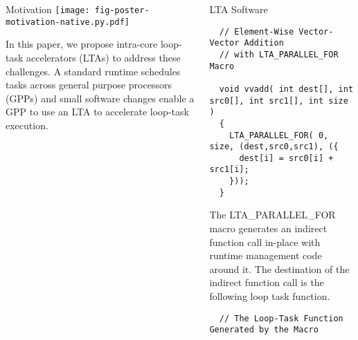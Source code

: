 \documentclass{cbxposter}
\renewcommand{\smallskip}{\vspace{0.16667in}}
\begin{document}
\begin{frame}[fragile,t]{}
\begin{columns}[T]
\begin{column}{10.5in}
\begin{block}{Motivation}
  \vspace{0.3in}
  \texttt{[image: fig-poster-motivation-native.py.pdf]}
  \vspace{0.3in}

  In this paper, we propose intra-core loop-task accelerators (LTAs) to
  address these challenges. A standard runtime schedules tasks across
  general purpose processors (GPPs) and small software changes enable a
  GPP to use an LTA to accelerate loop-task execution.

  \smallskip
\end{block}
\end{column}


\begin{column}{10.5in}


\begin{block}{LTA Software}

  \vspace{-0.1in}
  \vspace{-0.2in}

  \begin{lstlisting}
  // Element-Wise Vector-Vector Addition
  // with LTA_PARALLEL_FOR Macro

  void vvadd( int dest[], int src0[], int src1[], int size )
  {
    LTA_PARALLEL_FOR( 0, size, (dest,src0,src1), ({
      dest[i] = src0[i] + src1[i];
    }));
  }

  \end{lstlisting}
  \vspace{0.2in}

  The LTA\_PARALLEL\_FOR macro generates an indirect function call
  in-place with runtime management code around it. The destination of the
  indirect function call is the following loop task function.

  \vspace{0.2in}
  \begin{lstlisting}
  // The Loop-Task Function Generated by the Macro


\end{lstlisting}
\end{block}
\end{column}
\end{columns}
\end{frame}
\end{document}
